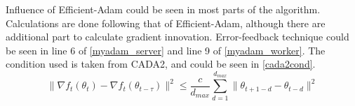 Influence of Efficient-Adam could be seen in most parts of the algorithm. Calculations are done following that of Efficient-Adam, although there are additional part to calculate gradient innovation. Error-feedback technique could be seen in line 6 of \autoref{myadam_server} and line 9 of \autoref{myadam_worker}. The condition used is taken from CADA2, and could be seen in \autoref{cada2cond}.
\begin{equation}
  \label{cada2cond}
  \|\nabla f_t(\theta_t) - \nabla f_t(\theta_{t-\tau})\|^2 \leq \frac{c}{d_{max}} \sum_{d=1}^{d_{max}} \|\theta_{t+1-d} - \theta_{t-d}\|^2
\end{equation}
